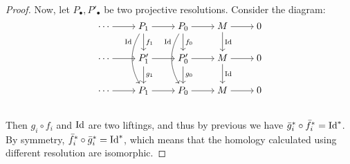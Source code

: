 \begin{theorem}
\begin{proof}
    Now, let $P_\bullet, {P'}_\bullet$ be two projective resolutions.
    Consider the diagram:
    \[
      \begin{tikzcd}[cramped]
        \dotsm \ar[r] & P_1 \ar[r] \ar[d, "f_1"] \ar[dd, bend right, "\Id"' near start]
                      & P_0 \ar[r] \ar[d, "f_0"] \ar[dd, bend right, "\Id"' near start]
                      & M \ar[r] \ar[d, "\Id"] & 0 \\
        \dotsm \ar[r] & P'_1 \ar[r] \ar[d, "g_1"]
                      & P'_0 \ar[r] \ar[d, "g_0"]
                      & M \ar[r] \ar[d, "\Id"] & 0 \\
        \dotsm \ar[r] & P_1 \ar[r]
                      & P_0 \ar[r]
                      & M \ar[r] & 0 \\
      \end{tikzcd}
    \]
    Then $g_i \circ f_i$ and ${\rm Id}$ are two liftings, and thus by previous
    we have $\bar g_i^* \circ \bar f_i^* = {\rm Id}^*$.
    By symmetry, $\bar f_i^* \circ \bar g_i^* = {\rm Id}^*$, which means that
    the homology calculated using different resolution are isomorphic.

  \end{proof}
\end{theorem}

